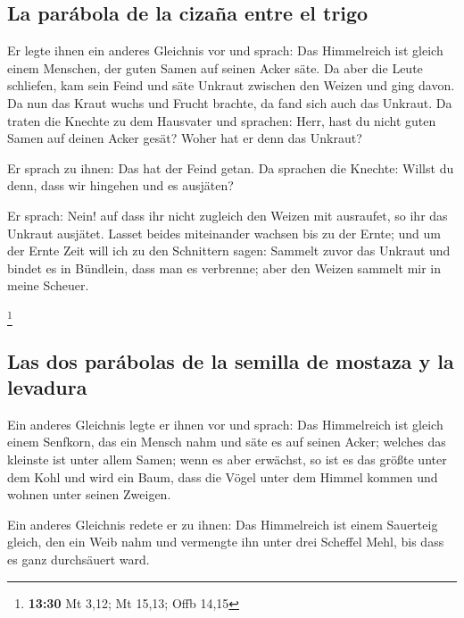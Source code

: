 \hypertarget{la-paruxe1bola-de-la-cizauxf1a-entre-el-trigo}{%
\subsection{La parábola de la cizaña entre el
trigo}\label{la-paruxe1bola-de-la-cizauxf1a-entre-el-trigo}}

 Er legte ihnen ein anderes Gleichnis vor und sprach: Das
Himmelreich ist gleich einem Menschen, der guten Samen auf seinen Acker
säte.  Da aber die Leute schliefen, kam sein Feind und
säte Unkraut zwischen den Weizen und ging davon.  Da nun
das Kraut wuchs und Frucht brachte, da fand sich auch das Unkraut.
 Da traten die Knechte zu dem Hausvater und sprachen:
Herr, hast du nicht guten Samen auf deinen Acker gesät? Woher hat er
denn das Unkraut?

 Er sprach zu ihnen: Das hat der Feind getan. Da sprachen
die Knechte: Willst du denn, dass wir hingehen und es ausjäten?

 Er sprach: Nein! auf dass ihr nicht zugleich den Weizen
mit ausraufet, so ihr das Unkraut ausjätet.  Lasset
beides miteinander wachsen bis zu der Ernte; und um der Ernte Zeit will
ich zu den Schnittern sagen: Sammelt zuvor das Unkraut und bindet es in
Bündlein, dass man es verbrenne; aber den Weizen sammelt mir in meine
Scheuer.

\footnote{\textbf{13:30} Mt 3,12; Mt 15,13; Offb 14,15}

\hypertarget{las-dos-paruxe1bolas-de-la-semilla-de-mostaza-y-la-levadura}{%
\subsection{Las dos parábolas de la semilla de mostaza y la
levadura}\label{las-dos-paruxe1bolas-de-la-semilla-de-mostaza-y-la-levadura}}

 Ein anderes Gleichnis legte er ihnen vor und sprach: Das
Himmelreich ist gleich einem Senfkorn, das ein Mensch nahm und säte es
auf seinen Acker;  welches das kleinste ist unter allem
Samen; wenn es aber erwächst, so ist es das größte unter dem Kohl und
wird ein Baum, dass die Vögel unter dem Himmel kommen und wohnen unter
seinen Zweigen.

 Ein anderes Gleichnis redete er zu ihnen: Das
Himmelreich ist einem Sauerteig gleich, den ein Weib nahm und vermengte
ihn unter drei Scheffel Mehl, bis dass es ganz durchsäuert ward.

